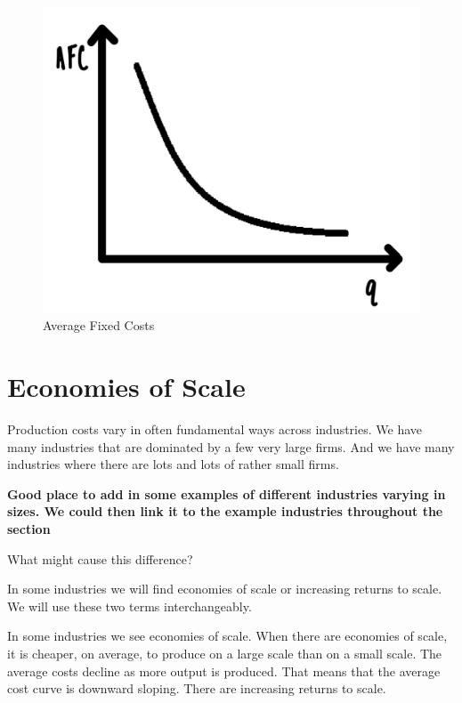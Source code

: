 \documentclass[
]{book}
\begin{document}
\begin{figure}

{\centering \includegraphics[width=0.75\linewidth]{img/ch4/fig1} 

}

\caption{Average Fixed Costs}\label{fig:fig401}
\end{figure}

\hypertarget{economies-of-scale}{%
\section{Economies of Scale}\label{economies-of-scale}}

Production costs vary in often fundamental ways across industries. We have many industries that are dominated by a few very large firms. And we have many industries where there are lots and lots of rather small firms.

\begin{addition}
\textbf{Good place to add in some examples of different industries varying in sizes. We could then link it to the example industries throughout the section}

\end{addition}

What might cause this difference?

In some industries we will find economies of scale or increasing returns to scale. We will use these two terms interchangeably.

In some industries we see economies of scale. When there are economies of scale, it is cheaper, on average, to produce on a large scale than on a small scale. The average costs decline as more output is produced. That means that the average cost curve is downward sloping. There are increasing returns to scale.
\end{document}
